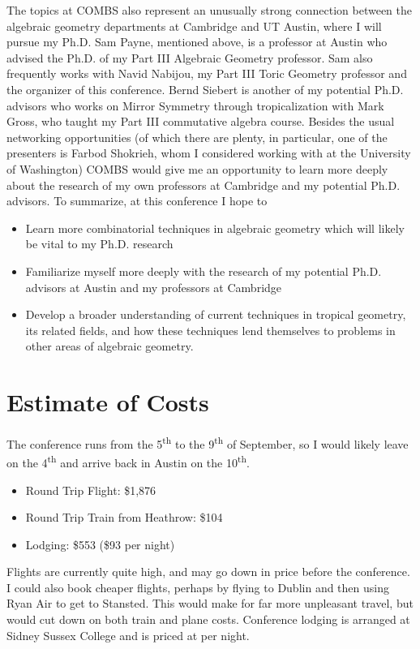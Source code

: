 \documentclass[12pt]{amsart}
\begin{document}
	The topics at COMBS also represent an unusually strong connection between the algebraic geometry departments at Cambridge and UT Austin, where I will pursue my Ph.D. Sam Payne, mentioned above, is a professor at Austin who advised the Ph.D. of my Part III Algebraic Geometry professor. Sam also frequently works with Navid Nabijou, my Part III Toric Geometry professor and the organizer of this conference. Bernd Siebert is another of my potential Ph.D. advisors who works on Mirror Symmetry through tropicalization with Mark Gross, who taught my Part III commutative algebra course. Besides the usual networking opportunities (of which there are plenty, in particular, one of the presenters is Farbod Shokrieh, whom I considered working with at the University of Washington) COMBS would give me an opportunity to learn more deeply about the research of my own professors at Cambridge and my potential Ph.D. advisors. To summarize, at this conference I hope to
	\begin{itemize}
		\item Learn more combinatorial techniques in algebraic geometry which will likely be vital to my Ph.D. research
		\item Familiarize myself more deeply with the research of my potential Ph.D. advisors at Austin and my professors at Cambridge
		\item Develop a broader understanding of current techniques in tropical geometry, its related fields, and how these techniques lend themselves to problems in other areas of algebraic geometry.
	\end{itemize}

	\section*{Estimate of Costs}
	The conference runs from the 5\textsuperscript{th} to the 9\textsuperscript{th} of September, so I would likely leave on the 4\textsuperscript{th} and arrive back in Austin on the 10\textsuperscript{th}.

	\begin{itemize}
		\item Round Trip Flight: \$1,876
		\item Round Trip Train from Heathrow: \$104
		\item Lodging: \$553 (\$93 per night)
	\end{itemize}

	Flights are currently quite high, and may go down in price before the conference. I could also book cheaper flights, perhaps by flying to Dublin and then using Ryan Air to get to Stansted. This would make for far more unpleasant travel, but would cut down on both train and plane costs. Conference lodging is arranged at Sidney Sussex College and is priced at  per night.
\end{document}
